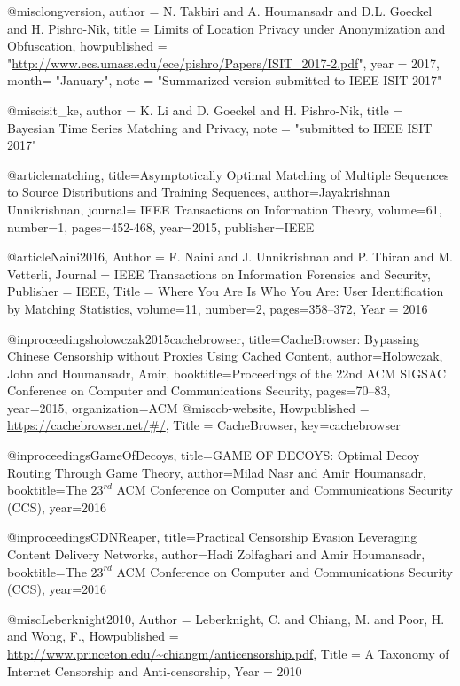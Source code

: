 {{{{{{{@misc{longversion,
  author = {N. Takbiri and A. Houmansadr and D.L. Goeckel and H. Pishro-Nik},
  title = {{Limits of Location Privacy under Anonymization and Obfuscation}},
  howpublished = "\url{http://www.ecs.umass.edu/ece/pishro/Papers/ISIT_2017-2.pdf}",
  year = 2017,
month= "January",
  note = "Summarized version submitted to IEEE ISIT 2017"
}

@misc{isit_ke,
  author = {K. Li and D. Goeckel and H. Pishro-Nik},
  title = {{Bayesian Time Series Matching and Privacy}},
  note = "submitted to IEEE ISIT 2017"
}

@article{matching,
  title={Asymptotically Optimal Matching of Multiple Sequences to Source Distributions and Training Sequences},
  author={Jayakrishnan Unnikrishnan},
  journal={ IEEE Transactions on Information Theory},
  volume={61},
  number={1},
  pages={452-468},
  year={2015},
  publisher={IEEE}
}


@article{Naini2016,
	Author = {F. Naini and J. Unnikrishnan and P. Thiran and M. Vetterli},
	Journal = {IEEE Transactions on Information Forensics and Security},
	Publisher = {IEEE},
	Title = {Where You Are Is Who You Are: User Identification by Matching Statistics},
	 volume={11},
    number={2},
     pages={358--372},
    Year = {2016}
}



@inproceedings{holowczak2015cachebrowser,
  title={{CacheBrowser: Bypassing Chinese Censorship without Proxies Using Cached Content}},
  author={Holowczak, John and Houmansadr, Amir},
  booktitle={Proceedings of the 22nd ACM SIGSAC Conference on Computer and Communications Security},
  pages={70--83},
  year={2015},
  organization={ACM}
}
@misc{cb-website,
	Howpublished = {\url{https://cachebrowser.net/#/}},
	Title = {{CacheBrowser}},
	key={cachebrowser}
}

@inproceedings{GameOfDecoys,
 title={{GAME OF DECOYS: Optimal Decoy Routing Through Game Theory}},
 author={Milad Nasr and Amir Houmansadr},
 booktitle={The $23^{rd}$ ACM Conference on Computer and Communications Security (CCS)},
 year={2016}
}

@inproceedings{CDNReaper,
 title={{Practical Censorship Evasion Leveraging Content Delivery Networks}},
 author={Hadi Zolfaghari and Amir Houmansadr},
 booktitle={The $23^{rd}$ ACM Conference on Computer and Communications Security (CCS)},
 year={2016}
}

@misc{Leberknight2010,
	Author = {Leberknight, C. and Chiang, M. and Poor, H. and Wong, F.},
	Howpublished = {\url{http://www.princeton.edu/~chiangm/anticensorship.pdf}},
	Title = {{A Taxonomy of Internet Censorship and Anti-censorship}},
	Year = {2010}}

}}}}}}}
